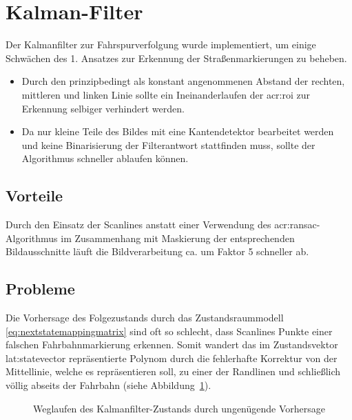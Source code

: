 \section{Kalman-Filter \dcsecondauthorshort}

Der Kalmanfilter zur Fahrspurverfolgung wurde implementiert, um einige Schwächen des 1. Ansatzes zur Erkennung der Straßenmarkierungen zu beheben.
\begin{itemize}
\item Durch den prinzipbedingt als konstant angenommenen Abstand der rechten, mittleren und linken Linie sollte ein \glqq Ineinanderlaufen \grqq der \gls{acr:roi} zur Erkennung selbiger verhindert werden.
\item Da nur kleine Teile des Bildes mit eine Kantendetektor bearbeitet werden und keine Binarisierung der Filterantwort stattfinden muss, sollte der Algorithmus schneller ablaufen können.
\end{itemize}

\subsection{Vorteile}
Durch den Einsatz der Scanlines anstatt einer Verwendung des \gls{acr:ransac}-Algorithmus im Zusammenhang mit Maskierung der entsprechenden Bildausschnitte läuft die Bildverarbeitung ca. um Faktor 5 schneller ab.

\subsection{Probleme}
Die Vorhersage des Folgezustands durch das Zustandsraummodell \eqref{eq:nextstatemappingmatrix} sind oft so schlecht, dass Scanlines Punkte einer falschen Fahrbahnmarkierung erkennen. Somit \glqq wandert \grqq das im Zustandsvektor \gls{lat:statevector} repräsentierte Polynom durch die fehlerhafte Korrektur von der Mittellinie, welche es repräsentieren soll, zu einer der Randlinen und schließlich völlig abseits der Fahrbahn (siehe Abbildung~\ref{fig:evaluation:kalman:weggezogen}).

\begin{figure}[ht] %
	\centering
	\qquad
	\qquad
	\caption{\glqq Weglaufen \grqq des Kalmanfilter-Zustands durch ungenügende Vorhersage}
	\label{fig:evaluation:kalman:weggezogen}
\end{figure}

